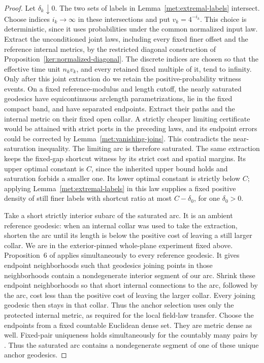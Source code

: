\documentclass[11pt]{article}
\numberwithin{equation}{section}
\theoremstyle{definition}
\theoremstyle{remark}
\newcommand{\1}{\mathbf 1}
\begin{document}
\begin{proof}
Let $\delta_k\downarrow0$.  The two sets of labels in
Lemma~\ref{met:extremal-labels} intersect.  Choose indices $i_k\to\infty$
in these intersections and put $v_k=4^{-i_k}$.  This choice is deterministic,
since it uses probabilities under the common normalized input law.
Extract the unconditioned joint laws, including every fixed finer
offset and the reference internal metrics, by the restricted diagonal
construction of Proposition~\ref{ker:normalized-diagonal}.  The discrete indices
are chosen so that the effective time unit $n_kv_k$, and every
retained fixed multiple of it, tend to infinity.  Only after this
joint extraction do we retain the positive-probability witness events.
On a fixed reference-modulus and
length cutoff, the nearly saturated geodesics have equicontinuous
arclength parametrizations, lie in the fixed compact band, and have
separated endpoints.  Extract their paths and the internal metric on
their fixed open collar.  A strictly cheaper limiting certificate
would be attained with strict ports in the preceding laws, and its
endpoint errors could be corrected by
Lemma~\ref{met:vanishing-joins}.  This contradicts the near-saturation
inequality.  The limiting arc is therefore saturated.  The same
extraction keeps the fixed-gap shortcut witness by its strict cost
and spatial margins.  Its upper optimal constant is $C$, since the
inherited upper bound holds and saturation forbids a smaller one.
Its lower optimal constant is strictly below $C$; applying
Lemma~\ref{met:extremal-labels} in this law supplies a fixed positive
density of still finer labels with shortcut ratio at most
$C-\delta_0$, for one $\delta_0>0$.

Take a short strictly interior subarc of the saturated arc.  It is an
ambient reference geodesic: when an internal collar was used to take
the extraction, shorten the arc until its length is below the
positive cost of leaving a still larger collar.  We are in the exterior-pinned whole-plane experiment fixed above.
Proposition~6 of \cite{BhatiaKavvadiasConfluence} applies simultaneously
to every reference geodesic.  It gives endpoint neighborhoods such
that geodesics joining points in those neighborhoods contain a
nondegenerate interior segment of our arc.  Shrink these endpoint
neighborhoods so that short internal connections to the arc, followed
by the arc, cost less than the positive cost of leaving the larger
collar.  Every joining geodesic then stays in that collar.  Thus the
anchor selection uses only the protected internal metric, as required
for the local field-law transfer.  Choose the endpoints from a fixed
countable Euclidean dense set.  They are metric dense as
well.  Fixed-pair uniqueness holds simultaneously for the countably
many pairs by \cite[Theorem~1.2]{MillerQianGeodesics}.  Thus the saturated arc contains
a nondegenerate segment of one of these unique anchor geodesics.


\end{proof}
\end{document}
